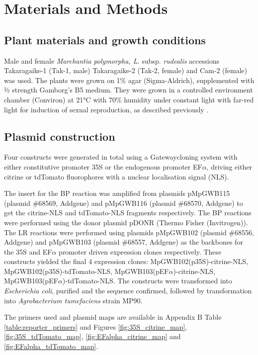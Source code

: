 \clearpage

\section{Materials and Methods}

\subsection{Plant materials and growth conditions}

Male and female \textit{Marchantia polymorpha, L.} subsp. \textit{rudealis} accessions Takaragaike-1 (Tak-1, male) Takaragaike-2 (Tak-2, female) and Cam-2 (female) was used. The plants were grown on 1\% agar (Sigma-Aldrich), supplemented with ½ strength Gamborg's B5 medium. They were grown in a controlled environment chamber (Conviron) at 21°C with 70\% humidity under constant light with far-red light for induction of sexual reproduction, as described previously \cite{RN212,RN254}.

\subsection{Plasmid construction}

Four constructs were generated in total  using a Gateway\textregistered cloning system with either constitutive promoter 35S or the endogenous promoter EF$\alpha$, driving either citrine or tdTomato fluorophores with a nuclear localisation signal (NLS).

The insert for the BP reaction was amplified from plasmids pMpGWB115 (plasmid \#68569, Addgene) and pMpGWB116 (plasmid \#68570, Addgene) \cite{RN72} to get the citrine-NLS and tdTomato-NLS fragments respectively. The BP reactions were performed using the donor plasmid pDONR (Thermo Fisher (Invitrogen)). The LR reactions were performed using plasmids pMpGWB102 (plasmid \#68556, Addgene) and pMpGWB103 (plasmid \#68557, Addgene)\cite{RN72} as the backbones for the 35S and EF$\alpha$ promoter driven expression clones respectively. These constructs yielded the final 4 expression clones: MpGWB102(p35S)-citrine-NLS, MpGWB102(p35S)-tdTomato-NLS, MpGWB103(pEF$\alpha$)-citrine-NLS, MpGWB103(pEF$\alpha$)-tdTomato-NLS. The constructs were transformed into \textit{Escherichia  coli}, purified and the sequence confirmed, followed by transformation into \textit{Agrobacterium tumefaciens} strain MP90.

The primers used and plasmid maps are available in Appendix B Table \ref{table:reporter_primers} and Figures \ref{fig:35S_citrine_map}, \ref{fig:35S_tdTomato_map}, \ref{fig:EFalpha_citrine_map} and \ref{fig:EFalpha_tdTomato_map}.

